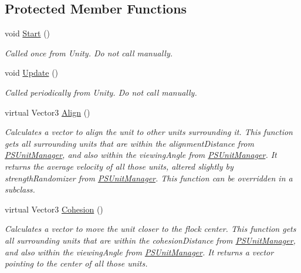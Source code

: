 \subsection*{Protected Member Functions}
\begin{DoxyCompactItemize}
\item 
\mbox{\label{class_p_s_flocking_1_1_p_s_flocking_unit_ac839f13af6962f86198dd14bf8e2495b}} 
void \hyperlink{class_p_s_flocking_1_1_p_s_flocking_unit_ac839f13af6962f86198dd14bf8e2495b}{Start} ()
\begin{DoxyCompactList}\small\item\em Called once from Unity. Do not call manually. \end{DoxyCompactList}\item 
\mbox{\label{class_p_s_flocking_1_1_p_s_flocking_unit_a4bfe16a5cf81ba127fc76597cb86623a}} 
void \hyperlink{class_p_s_flocking_1_1_p_s_flocking_unit_a4bfe16a5cf81ba127fc76597cb86623a}{Update} ()
\begin{DoxyCompactList}\small\item\em Called periodically from Unity. Do not call manually. \end{DoxyCompactList}\item 
virtual Vector3 \hyperlink{class_p_s_flocking_1_1_p_s_flocking_unit_ada3fa9e23f12a1b8258dc324f5b3e511}{Align} ()
\begin{DoxyCompactList}\small\item\em Calculates a vector to align the unit to other units surrounding it. This function gets all surrounding units that are within the alignment\+Distance from \hyperlink{class_p_s_flocking_1_1_p_s_unit_manager}{P\+S\+Unit\+Manager}, and also within the viewing\+Angle from \hyperlink{class_p_s_flocking_1_1_p_s_unit_manager}{P\+S\+Unit\+Manager}. It returns the average velocity of all those units, altered slightly by strength\+Randomizer from \hyperlink{class_p_s_flocking_1_1_p_s_unit_manager}{P\+S\+Unit\+Manager}. This function can be overridden in a subclass. \end{DoxyCompactList}\item 
virtual Vector3 \hyperlink{class_p_s_flocking_1_1_p_s_flocking_unit_a87ad210603e8d8451e14a4de8af9cba0}{Cohesion} ()
\begin{DoxyCompactList}\small\item\em Calculates a vector to move the unit closer to the flock center. This function gets all surrounding units that are within the cohesion\+Distance from \hyperlink{class_p_s_flocking_1_1_p_s_unit_manager}{P\+S\+Unit\+Manager}, and also within the viewing\+Angle from \hyperlink{class_p_s_flocking_1_1_p_s_unit_manager}{P\+S\+Unit\+Manager}. It returns a vector pointing to the center of all those units. \end{DoxyCompactList}\item 

\end{DoxyCompactItemize}
